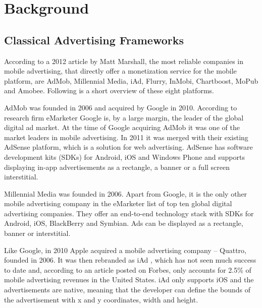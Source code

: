 
\chapter{Background} %



\section{Classical Advertising Frameworks}

According to a 2012 article by Matt Marshall, the most reliable companies in mobile advertising, that directly offer a monetization service for the mobile platform, are AdMob, Millennial Media, iAd, Flurry, InMobi, Chartboost, MoPub and Amobee. \cite{mmarshall-top10} Following is a short overview of these eight platforms.

AdMob was founded in 2006 and acquired by Google in 2010. \cite{crunchbase-admob} According to research firm eMarketer Google is, by a large margin, the leader of the global digital ad market. \cite{emarketer-google} At the time of Google acquiring AdMob it was one of the market leaders in mobile advertising. \cite{google-admob} In 2011 it was merged with their existing AdSense platform, which is a solution for web advertising. \cite{admob-adsense} AdSense has software development kits (SDKs) for Android, iOS and Windows Phone \cite{admob-sdk}  and supports displaying in-app advertisements as a rectangle, a banner \cite{admob-banner} or a full screen interstitial.\cite{admob-interstitial}

Millennial Media was founded in 2006. \cite{crunchbase-millenial} Apart from Google, it is the only other mobile advertising company in the eMarketer list of top ten global digital advertising companies. \cite{emarketer-google} They offer an end-to-end technology stack with SDKs for Android, iOS, BlackBerry and Symbian. \cite{millenial-sdk} Ads can be displayed as a rectangle, banner or interstitial. \cite{millenial-android}

Like Google, in 2010 Apple acquired a mobile advertising company -- Quattro, founded in 2006. \cite{crunchbase-quattro} It was then rebranded as iAd \cite{forbes-iad}, which has not seen much success to date and, according to an article posted on Forbes, only accounts for 2.5\% of mobile advertising revenues in the United States. \cite{forbes-iad2} iAd only supports iOS and the advertisements are native, meaning that the developer can define the bounds of the advertisement with x and y coordinates, width and height. \cite{iad-tutorial}

